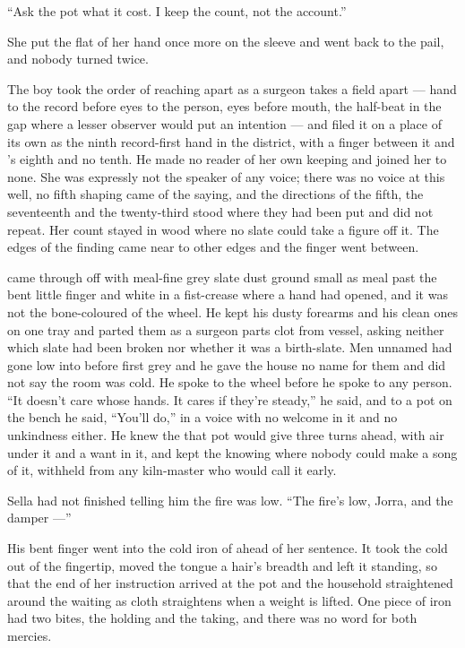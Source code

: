 “Ask the pot what it cost. I keep the count, not the account.”

She put the flat of her hand once more on the sleeve and went back to the pail, and nobody turned twice.

The boy took the order of reaching apart as a surgeon takes a field apart --- hand to the record before eyes to the person, eyes before mouth, the half-beat in the gap where a lesser observer would put an intention --- and filed it on a place of its own as the ninth record-first hand in the district, with a finger between it and 's eighth and no tenth. He made no reader of her own keeping and joined her to none. She was expressly not the speaker of any voice; there was no voice at this well, no fifth shaping came of the saying, and the directions of the fifth, the seventeenth and the twenty-third stood where they had been put and did not repeat. Her count stayed in wood where no slate could take a figure off it. The edges of the finding came near to other edges and the finger went between.

\scenebreak

 came through  off  with meal-fine grey slate dust ground small as meal past the bent little finger and white in a fist-crease where a hand had opened, and it was not the bone-coloured  of the wheel. He kept his dusty forearms and his clean ones on one tray and parted them as a surgeon parts clot from vessel, asking neither which slate had been broken nor whether it was a birth-slate. Men unnamed had gone low into  before first grey and he gave the house no name for them and did not say the room was cold. He spoke to the wheel before he spoke to any person. “It doesn't care whose hands. It cares if they're steady,” he said, and to a pot on the bench he said, “You'll do,” in a voice with no welcome in it and no unkindness either. He knew the  that pot would give three turns ahead, with air under it and a want in it, and kept the knowing where nobody could make a song of it, withheld from any kiln-master who would call it early.

Sella had not finished telling him the fire was low. “The fire's low, Jorra, and the damper ---”

His bent finger went into the cold iron of  ahead of her sentence. It took the cold out of the fingertip, moved the tongue a hair's breadth and left it standing, so that the end of her instruction arrived at the pot and the household straightened around the waiting as cloth straightens when a weight is lifted. One piece of iron had two bites, the holding and the taking, and there was no  word for both mercies.

